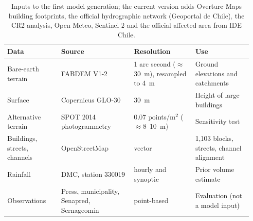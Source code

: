 \begin{table}[htbp]\centering\small
\caption{Inputs to the first model generation; the current version adds Overture Maps building footprints, the official hydrographic network (Geoportal de Chile), the CR2 analysis, Open-Meteo, Sentinel-2 and the official affected area from IDE Chile.}\label{tab:datos}
\begin{tabular}{p{}p{}p{}p{}}\toprule
Data & Source & Resolution & Use\\\midrule
Bare-earth terrain & FABDEM V1-2 \citep{fabdem2023} & 1 arc second ($\approx$\SI{30}{m}), resampled to \SI{4}{m} & Ground elevations and catchments\\
Surface & Copernicus GLO-30 \citep{copernicus_glo30} & \SI{30}{m} & Height of large buildings\\
Alternative terrain & SPOT 2014 photogrammetry \citep{hussain2021} & 0.07 points/m$^2$ ($\approx$\SI{8}{}--\SI{10}{m}) & Sensitivity test\\
Buildings, streets, channels & OpenStreetMap \citep{osm2026} & vector & 1,103 blocks, streets, channel alignment\\
Rainfall & DMC, station 330019 \citep{dmc2026} & hourly and synoptic & Prior volume estimate\\
Observations & Press, municipality, Senapred, Sernageomin & point-based & Evaluation (not a model input)\\
\bottomrule\end{tabular}\end{table}
